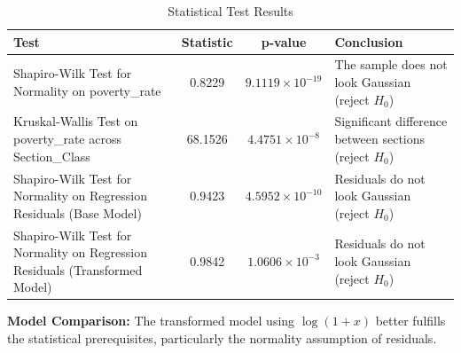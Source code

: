 \begin{table}[h]
\centering
\caption{Statistical Test Results}
\label{tab:statistical_tests}

\small

\begin{tabular}{|p{6cm}|c|c|p{4.5cm}|}
\hline
\textbf{Test} & \textbf{Statistic} & \textbf{p-value} & \textbf{Conclusion} \\
\hline

Shapiro-Wilk Test for Normality on poverty\_rate
& 0.8229
& $9.1119 \times 10^{-19}$
& The sample does not look Gaussian (reject $H_0$)
\\
\hline

Kruskal-Wallis Test on poverty\_rate across Section\_Class
& 68.1526
& $4.4751 \times 10^{-8}$
& Significant difference between sections (reject $H_0$)
\\
\hline

Shapiro-Wilk Test for Normality on Regression Residuals (Base Model)
& 0.9423
& $4.5952 \times 10^{-10}$
& Residuals do not look Gaussian (reject $H_0$)
\\
\hline

Shapiro-Wilk Test for Normality on Regression Residuals (Transformed Model)
& 0.9842
& $1.0606 \times 10^{-3}$
& Residuals do not look Gaussian (reject $H_0$)
\\
\hline

\end{tabular}

\vspace{0.4cm}

\footnotesize
\textbf{Model Comparison:}
The transformed model using $\log(1+x)$ better fulfills the statistical prerequisites, particularly the normality assumption of residuals.

\end{table}
    